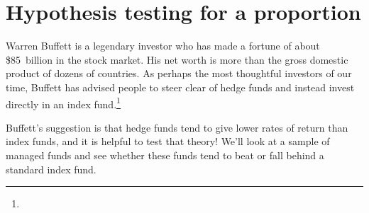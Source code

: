 



\section{Hypothesis testing for a proportion}
\label{hypothesis_testing_one_prop}
\label{hypothesisTesting}


Warren Buffett is a legendary investor who has made a fortune
of about \$85~billion in the stock market. His net worth is
more than the gross domestic product of dozens of countries.
As perhaps the most thoughtful investors of our time, Buffett
has advised people to steer clear of hedge funds and instead
invest directly in an index
fund.\footnote{}

Buffett's suggestion is that hedge funds tend to give lower
rates of return than index funds, and it is helpful to test
that theory! We'll look at a sample of managed funds
and see whether these funds tend to beat or fall behind a
standard index fund.







%
%


